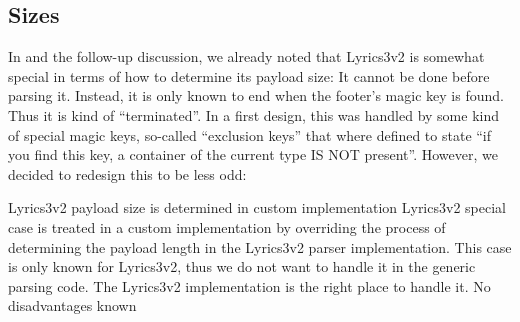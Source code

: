 \subsection{Sizes}%
\label{sec:Sizes}%

In  and the follow-up discussion, we already noted that Lyrics3v2 is somewhat special in terms of how to determine its payload size: It cannot be done before parsing it. Instead, it is only known to end when the footer's magic key is found. Thus it is kind of ``terminated''. In a first design, this was handled by some kind of special magic keys, so-called ``exclusion keys'' that where defined to state ``if you find this key, a container of the current type IS NOT present''. However, we decided to redesign this to be less odd:

{%
Lyrics3v2 payload size is determined in custom implementation
}
{%
Lyrics3v2 special case is treated in a custom implementation by overriding the process of determining the payload length in the Lyrics3v2 parser implementation.
}
{%
This case is only known for Lyrics3v2, thus we do not want to handle it in the generic parsing code. The Lyrics3v2 implementation is the right place to handle it.
}
{%
No disadvantages known
}












%
%
